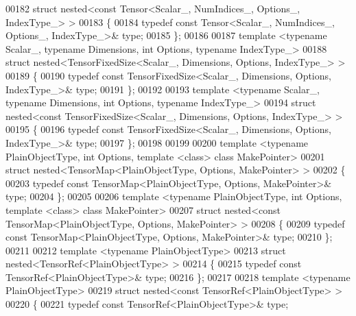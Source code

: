 \begin{DoxyCode}
00182 \textcolor{keyword}{struct }nested<const Tensor<Scalar\_, NumIndices\_, Options\_, IndexType\_> >
00183 \{
00184   \textcolor{keyword}{typedef} \textcolor{keyword}{const} Tensor<Scalar\_, NumIndices\_, Options\_, IndexType\_>& type;
00185 \};
00186 
00187 \textcolor{keyword}{template} <\textcolor{keyword}{typename} Scalar\_, \textcolor{keyword}{typename} Dimensions, \textcolor{keywordtype}{int} Options, \textcolor{keyword}{typename} IndexType\_>
00188 \textcolor{keyword}{struct }nested<TensorFixedSize<Scalar\_, Dimensions, Options, IndexType\_> >
00189 \{
00190   \textcolor{keyword}{typedef} \textcolor{keyword}{const} TensorFixedSize<Scalar\_, Dimensions, Options, IndexType\_>& type;
00191 \};
00192 
00193 \textcolor{keyword}{template} <\textcolor{keyword}{typename} Scalar\_, \textcolor{keyword}{typename} Dimensions, \textcolor{keywordtype}{int} Options, \textcolor{keyword}{typename} IndexType\_>
00194 \textcolor{keyword}{struct }nested<const TensorFixedSize<Scalar\_, Dimensions, Options, IndexType\_> >
00195 \{
00196   \textcolor{keyword}{typedef} \textcolor{keyword}{const} TensorFixedSize<Scalar\_, Dimensions, Options, IndexType\_>& type;
00197 \};
00198 
00199 
00200 \textcolor{keyword}{template} <\textcolor{keyword}{typename} PlainObjectType, \textcolor{keywordtype}{int} Options, \textcolor{keyword}{template} <\textcolor{keyword}{class}> \textcolor{keyword}{class }MakePointer>
00201 \textcolor{keyword}{struct }nested<TensorMap<PlainObjectType, Options, MakePointer> >
00202 \{
00203   \textcolor{keyword}{typedef} \textcolor{keyword}{const} TensorMap<PlainObjectType, Options, MakePointer>& type;
00204 \};
00205 
00206 \textcolor{keyword}{template} <\textcolor{keyword}{typename} PlainObjectType, \textcolor{keywordtype}{int} Options, \textcolor{keyword}{template} <\textcolor{keyword}{class}> \textcolor{keyword}{class }MakePointer>
00207 \textcolor{keyword}{struct }nested<const TensorMap<PlainObjectType, Options, MakePointer> >
00208 \{
00209   \textcolor{keyword}{typedef} \textcolor{keyword}{const} TensorMap<PlainObjectType, Options, MakePointer>& type;
00210 \};
00211 
00212 \textcolor{keyword}{template} <\textcolor{keyword}{typename} PlainObjectType>
00213 \textcolor{keyword}{struct }nested<TensorRef<PlainObjectType> >
00214 \{
00215   \textcolor{keyword}{typedef} \textcolor{keyword}{const} TensorRef<PlainObjectType>& type;
00216 \};
00217 
00218 \textcolor{keyword}{template} <\textcolor{keyword}{typename} PlainObjectType>
00219 \textcolor{keyword}{struct }nested<const TensorRef<PlainObjectType> >
00220 \{
00221   \textcolor{keyword}{typedef} \textcolor{keyword}{const} TensorRef<PlainObjectType>& type;

\end{DoxyCode}
